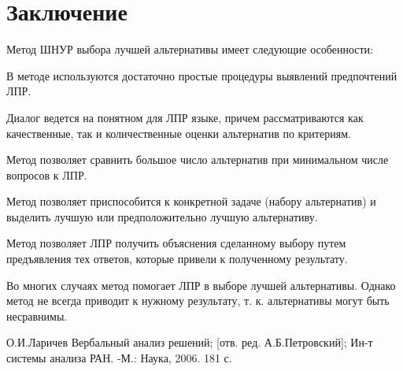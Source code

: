 \documentclass[a4paper, 14pt]{report}
\begin{document}
\chapter{Заключение}

	Метод ШНУР выбора лучшей альтернативы имеет следующие особенности:
	
	В методе используются достаточно простые процедуры выявлений предпочтений ЛПР.
	
	Диалог ведется на понятном для ЛПР языке, причем рассматриваются как качественные, так и количественные оценки альтернатив по критериям.
	
	Метод позволяет сравнить большое число альтернатив при минимальном числе вопросов к ЛПР.
	
	Метод позволяет приспособится к конкретной задаче (набору альтернатив) и выделить лучшую или предположительно лучшую альтернативу.
	
	Метод позволяет ЛПР получить объяснения сделанному выбору путем предъявления тех ответов, которые привели к полученному результату. 
	
	Во многих случаях метод помогает ЛПР в выборе лучшей альтернативы. Однако метод не всегда приводит к нужному результату, т. к. альтернативы могут быть несравнимы.

\begin{thebibliography}{3}
	О.И.Ларичев Вербальный анализ решений; [отв. ред. А.Б.Петровский]; Ин-т системы анализа РАН. -М.: Наука, 2006. 181 с.
\end{thebibliography}
\end{document}
